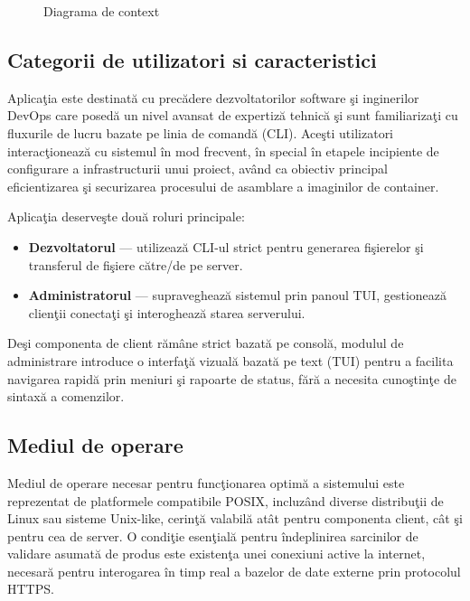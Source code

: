 \documentclass[12pt, a4paper]{article}
\begin{document}
\begin{figure}[h]
    \centering
    \caption{Diagrama de context}
    \label{fig:context}
\end{figure}

\subsection{Categorii de utilizatori si caracteristici}

Aplica\c{t}ia este destinat\u{a} cu prec\u{a}dere dezvoltatorilor software \c{s}i inginerilor DevOps care posed\u{a} un
nivel avansat de expertiz\u{a} tehnic\u{a} \c{s}i sunt familiariza\c{t}i cu fluxurile de lucru bazate pe linia de comand\u{a}
(CLI). Ace\c{s}ti utilizatori interac\c{t}ioneaz\u{a} cu sistemul \^{i}n mod frecvent, \^{i}n special \^{i}n etapele incipiente
de configurare a infrastructurii unui proiect, av\^{a}nd ca obiectiv principal eficientizarea \c{s}i securizarea
procesului de asamblare a imaginilor de container.

Aplica\c{t}ia deserve\c{s}te dou\u{a} roluri principale:
\begin{itemize}
    \item \textbf{Dezvoltatorul} --- utilizeaz\u{a} CLI-ul strict pentru generarea fi\c{s}ierelor \c{s}i transferul de
    fi\c{s}iere c\u{a}tre/de pe server.
    \item \textbf{Administratorul} --- supravegheaz\u{a} sistemul prin panoul TUI, gestioneaz\u{a} clien\c{t}ii
    conecta\c{t}i \c{s}i interogheaz\u{a} starea serverului.
\end{itemize}

De\c{s}i componenta de client r\u{a}m\^{a}ne strict bazat\u{a} pe consol\u{a}, modulul de administrare introduce o
interfa\c{t}\u{a} vizual\u{a} bazat\u{a} pe text (TUI) pentru a facilita navigarea rapid\u{a} prin meniuri \c{s}i rapoarte de
status, f\u{a}r\u{a} a necesita cuno\c{s}tin\c{t}e de sintax\u{a} a comenzilor.

\subsection{Mediul de operare}

Mediul de operare necesar pentru func\c{t}ionarea optim\u{a} a sistemului este reprezentat de platformele
compatibile POSIX, incluz\^{a}nd diverse distribu\c{t}ii de Linux sau sisteme Unix-like, cerin\c{t}\u{a} valabil\u{a}
at\^{a}t pentru componenta client, c\^{a}t \c{s}i pentru cea de server. O condi\c{t}ie esen\c{t}ial\u{a} pentru \^{i}ndeplinirea
sarcinilor de validare asumat\u{a} de produs este existen\c{t}a unei conexiuni active la internet, necesar\u{a}
pentru interogarea \^{i}n timp real a bazelor de date externe prin protocolul HTTPS.
\end{document}
